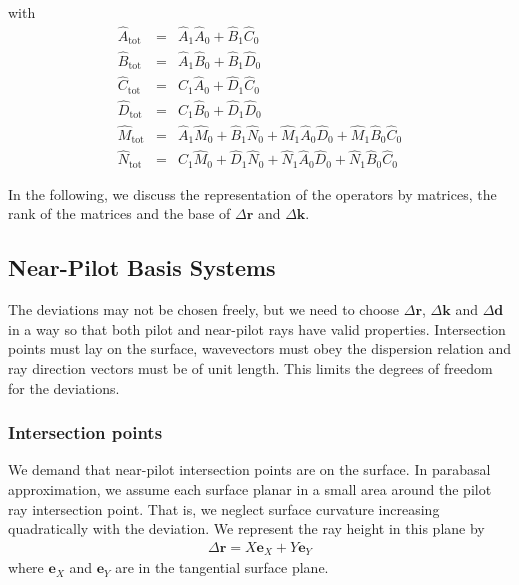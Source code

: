 \documentclass[12pt,a4paper,twoside,openright,BCOR10mm,headsepline,titlepage,abstracton,chapterprefix,final]{scrreprt}
\newcommand\Vector[1]{{\mathbf{#1}}}
\newcommand\wavenumber{k}
\newcommand\Wavevector{\Vector{\wavenumber}}
\newcommand\tot{\textrm{tot}}
\begin{document}
with
\begin{subequations}\label{eq:xyuv_total_propagation}
\begin{eqnarray}
 \hat{A}_\tot &=& \hat{A}_1 \hat{A}_0 + \hat{B}_1 \hat{C}_0 \\
 \hat{B}_\tot &=& \hat{A}_1 \hat{B}_0 + \hat{B}_1 \hat{D}_0 \\
 \hat{C}_\tot &=& \hat{C}_1 \hat{A}_0 + \hat{D}_1 \hat{C}_0\\
 \hat{D}_\tot &=& \hat{C}_1 \hat{B}_0 + \hat{D}_1 \hat{D}_0 \\
 \hat{M}_\tot &=& \hat{A}_1 \hat{M}_0 + \hat{B}_1 \hat{N}_0 + \hat{M}_1 \hat{A}_0 \hat{D}_0 + \hat{M}_1 \hat{B}_0 \hat{C}_0 \\
 \hat{N}_\tot &=& \hat{C}_1 \hat{M}_0 + \hat{D}_1 \hat{N}_0 + \hat{N}_1 \hat{A}_0 \hat{D}_0 + \hat{N}_1 \hat{B}_0 \hat{C}_0
\end{eqnarray}
 \end{subequations}


In the following, we discuss the representation of the operators by matrices, 
the rank of the matrices and the base of $\Delta \Vector{r}$ and $\Delta \Wavevector$.


\subsection{Near-Pilot Basis Systems}

The deviations may not be chosen freely, but we need to choose
$\Delta\Vector{r}$, $\Delta\Wavevector$ and $\Delta\Vector{d}$ 
in a way so that both pilot and near-pilot rays
have valid properties.
Intersection points must lay on the surface,
wavevectors must obey the dispersion relation 
and ray direction vectors must be of unit length.
This limits the degrees of freedom for the deviations.

\subsubsection{Intersection points}

We demand that near-pilot intersection points are on the surface.
In parabasal approximation, we assume each surface planar in a small area around the pilot ray intersection point.
That is, we neglect surface curvature increasing quadratically with the deviation. 
We represent the ray height in this plane by
\begin{eqnarray}
 \Delta\Vector{r} = X \Vector{e}_{X} + Y \Vector{e}_{Y}
 \label{eq:deltaR_equals_XY}
\end{eqnarray}
where $\Vector{e}_{X}$ and $\Vector{e}_{Y}$ are in the tangential surface plane.
\end{document}
